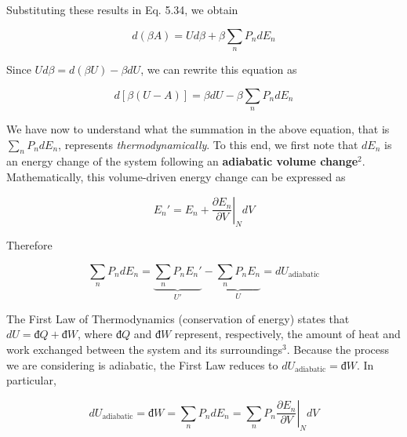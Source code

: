 \documentclass[12pt,a4paper]{report}
\newcommand{\esp}{\vspace{0.5cm}}
\begin{document}
\esp

Substituting these results in Eq. 5.34, we obtain

\esp

\begin{equation}
	d(\beta A) = U d\beta + \beta \sum_{n} P_n dE_n \tag{5.37}
\end{equation}

\esp

Since $U d\beta = d(\beta U) - \beta dU$, we can rewrite this equation as

\esp

\begin{equation}
	d[\beta(U - A)] = \beta dU - \beta \sum_{n} P_n dE_n \tag{5.38}
\end{equation}

\esp

We have now to understand what the summation in the above equation, that is $\sum_{n} P_n dE_n$, represents \textit{thermodynamically}. To this end, we first note that $dE_n$ is an energy change of the system following an \textbf{adiabatic volume change}$^2$. Mathematically, this volume-driven energy change can be expressed as

\esp

\begin{equation}
	E_n' = E_n + \left. \frac{\partial E_n}{\partial V} \right|_{N} dV \tag{5.39}
\end{equation}

\esp

Therefore

\esp

\begin{equation}
	\sum_{n} P_n dE_n = \underbrace{\sum_{n} P_n E_n'}_{U'} - \underbrace{\sum_{n} P_n E_n}_{U} = dU_{\text{adiabatic}} \tag{5.40}
\end{equation}

\esp

The First Law of Thermodynamics (conservation of energy) states that $dU = đQ + đW$, where $đQ$ and $đW$ represent, respectively, the amount of heat and work exchanged between the system and its surroundings$^3$. Because the process we are considering is adiabatic, the First Law reduces to $dU_{\text{adiabatic}} = đW$. In particular,

\esp

\begin{equation}
	dU_{\text{adiabatic}} = đW = \sum_{n} P_n dE_n = \sum_{n} P_n \left. \frac{\partial E_n}{\partial V} \right|_N dV \tag{5.43}
\end{equation}
\end{document}
